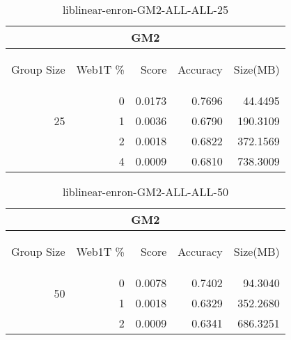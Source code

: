 \begin{center}
\begin{table}[htbp] 
 \begin{center}
\begin{tabular}{ | r | r | r | r | r |}
\hline
\multicolumn{5}{|c|}{GM2}\\
\hline
\begin{sideways}Group Size\end{sideways} & \begin{sideways}Web1T \%\end{sideways} & \begin{sideways}Score\end{sideways} & \begin{sideways}Accuracy\end{sideways} & \begin{sideways}Size(MB)\end{sideways}\\
\hline
\multirow{3}{*}{25}
 & 0 & 0.0173 & 0.7696 & 44.4495\\ \cline{2-5}
 & 1 & 0.0036 & 0.6790 & 190.3109\\ \cline{2-5}
 & 2 & 0.0018 & 0.6822 & 372.1569\\ \cline{2-5}
 & 4 & 0.0009 & 0.6810 & 738.3009\\ \cline{2-5}
\hline
\end{tabular}
\caption{liblinear-enron-GM2-ALL-ALL-25}
\label{table:liblinear-enron-GM2-ALL-ALL-25}
\end{center}
 \end{table}
\end{center}

\begin{center}
\begin{table}[htbp] 
 \begin{center}
\begin{tabular}{ | r | r | r | r | r |}
\hline
\multicolumn{5}{|c|}{GM2}\\
\hline
\begin{sideways}Group Size\end{sideways} & \begin{sideways}Web1T \%\end{sideways} & \begin{sideways}Score\end{sideways} & \begin{sideways}Accuracy\end{sideways} & \begin{sideways}Size(MB)\end{sideways}\\
\hline
\multirow{2}{*}{50}
 & 0 & 0.0078 & 0.7402 & 94.3040\\ \cline{2-5}
 & 1 & 0.0018 & 0.6329 & 352.2680\\ \cline{2-5}
 & 2 & 0.0009 & 0.6341 & 686.3251\\ \cline{2-5}
\hline
\end{tabular}
\caption{liblinear-enron-GM2-ALL-ALL-50}
\label{table:liblinear-enron-GM2-ALL-ALL-50}
\end{center}
 \end{table}
\end{center}

